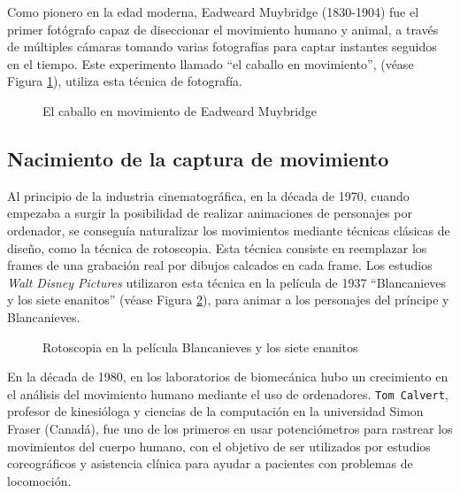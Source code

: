 Como pionero en la edad moderna, Eadweard Muybridge (1830-1904) fue el primer fotógrafo capaz de diseccionar el movimiento humano y animal, a través de múltiples cámaras tomando varias fotografías para captar instantes seguidos en el tiempo. Este experimento llamado ``el caballo en movimiento'', (véase Figura \ref{fig:EadweardMuybridgeHorse}),  utiliza esta técnica de fotografía. \cite{Mejias2014} \cite{Menendez2015}


\begin{figure}[h!]
    \centering
    \caption{El caballo en movimiento de Eadweard Muybridge}
    \label{fig:EadweardMuybridgeHorse}  
\end{figure}


\subsection{Nacimiento de la captura de movimiento}

Al principio de la industria cinematográfica, en la década de 1970, cuando empezaba a surgir la posibilidad de realizar animaciones de personajes por ordenador, se conseguía naturalizar los movimientos mediante técnicas clásicas de diseño, como la técnica de rotoscopia. 
Esta técnica consiste en reemplazar los frames de una grabación real por dibujos calcados en cada frame. Los estudios \textit{Walt Disney Pictures} utilizaron esta técnica en la película de 1937 ``Blancanieves y los siete enanitos'' (véase Figura \ref{fig:Blancanieves}),  para animar a los personajes del príncipe y Blancanieves. 

\begin{figure}[h!]
    \centering
    \caption{Rotoscopia en la película Blancanieves y los siete enanitos}
    \label{fig:Blancanieves}  
\end{figure}

En la década de 1980, en los laboratorios de biomecánica hubo un crecimiento en el análisis del movimiento humano mediante el uso de ordenadores. \texttt{Tom Calvert}, profesor de kinesióloga y ciencias de la computación en la universidad Simon Fraser (Canadá), fue uno de los primeros en usar potenciómetros para rastrear los movimientos del cuerpo humano, con el objetivo de ser utilizados por estudios coreográficos y asistencia clínica para ayudar a pacientes con problemas de locomoción.

